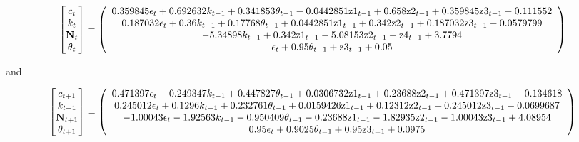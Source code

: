 \documentclass[12pt]{article}
\begin{document}
{\tiny
\begin{gather}
  \begin{bmatrix}
c_t\\k_t\\ \rcpC_t\\\theta_t
  \end{bmatrix}=%
   \left(
   \begin{array}{c}
 0.359845 \epsilon _t+0.692632 k_{t-1}+0.341853 \theta _{t-1}-0.0442851
   \text{z1}_{t-1}+0.658 \text{z2}_{t-1}+0.359845 \text{z3}_{t-1}-0.111552 \\
 0.187032 \epsilon _t+0.36 k_{t-1}+0.17768 \theta _{t-1}+0.0442851
   \text{z1}_{t-1}+0.342 \text{z2}_{t-1}+0.187032 \text{z3}_{t-1}-0.0579799 \\
 -5.34898 k_{t-1}+0.342 \text{z1}_{t-1}-5.08153
   \text{z2}_{t-1}+\text{z4}_{t-1}+3.7794 \\
 \epsilon _t+0.95 \theta _{t-1}+\text{z3}_{t-1}+0.05 \\
   \end{array}
   \right)
\end{gather}
}

and 


{\tiny
\begin{gather}
  \begin{bmatrix}
c_{t+1}\\k_{t+1}\\ \rcpC_{t+1}\\\theta_{t+1}
  \end{bmatrix}=%
  \left(
   \begin{array}{c}
 0.471397 \epsilon _t+0.249347 k_{t-1}+0.447827 \theta _{t-1}+0.0306732
   \text{z1}_{t-1}+0.23688 \text{z2}_{t-1}+0.471397 \text{z3}_{t-1}-0.134618 \\
 0.245012 \epsilon_t+0.1296 k_{t-1}+0.232761 \theta _{t-1}+0.0159426
   \text{z1}_{t-1}+0.12312 \text{z2}_{t-1}+0.245012 \text{z3}_{t-1}-0.0699687 \\
 -1.00043 \epsilon _t-1.92563 k_{t-1}-0.950409 \theta _{t-1}-0.23688
   \text{z1}_{t-1}-1.82935 \text{z2}_{t-1}-1.00043 \text{z3}_{t-1}+4.08954 \\
 0.95 \epsilon _t+0.9025 \theta _{t-1}+0.95 \text{z3}_{t-1}+0.0975 \\
   \end{array}
   \right)
\end{gather}}
\end{document}
